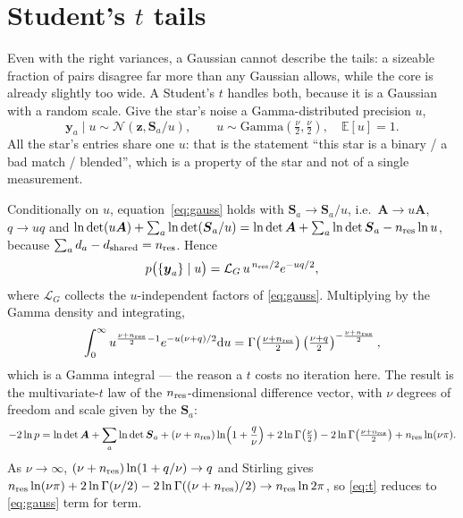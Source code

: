 \documentclass[11pt,a4paper]{article}
\newcommand{\bv}[1]{\boldsymbol{#1}}          %
\newcommand{\bM}[1]{\boldsymbol{#1}}          %
\newcommand{\dd}{\mathrm{d}}
\newcommand{\lndet}{\ln\det}
\newcommand{\N}{\mathcal{N}}
\begin{document}
\section{Student's $t$ tails}
\label{sec:t}

Even with the right variances, a Gaussian cannot describe the tails: a sizeable
fraction of pairs disagree far more than any Gaussian allows, while the core is
already slightly too wide. A Student's $t$ handles both, because it is a Gaussian
with a random scale. Give the star's noise a Gamma-distributed precision $u$,
\begin{equation}
  \bv y_a \mid u \sim \N(\bv z, \bM S_a/u), \qquad
  u \sim \mathrm{Gamma}\!\left(\tfrac\nu2,\tfrac\nu2\right), \quad \mathbb E[u]=1 .
\end{equation}
All the star's entries share one $u$: that is the statement ``this star is a
binary / a bad match / blended'', which is a property of the star and not of a
single measurement.

Conditionally on $u$, equation~\eqref{eq:gauss} holds with $\bM S_a\to\bM S_a/u$,
i.e.\ $\bM A\to u\bM A$, $q\to uq$ and $\lndet(u\bM A)+\sum_a\lndet(\bM S_a/u)
= \lndet\bM A+\sum_a\lndet\bM S_a - n_{\rm res}\ln u$, because
$\sum_a d_a - d_{\rm shared} = n_{\rm res}$. Hence
\begin{equation}
  p\big(\{\bv y_a\}\mid u\big) = \mathcal L_G\, u^{\,n_{\rm res}/2}e^{-uq/2},
\end{equation}
where $\mathcal L_G$ collects the $u$-independent factors of
\eqref{eq:gauss}. Multiplying by the Gamma density and integrating,
\begin{equation}
  \int_0^\infty u^{\frac{\nu+n_{\rm res}}{2}-1}e^{-u(\nu+q)/2}\dd u
  = \Gamma\!\left(\tfrac{\nu+n_{\rm res}}{2}\right)
    \left(\tfrac{\nu+q}{2}\right)^{-\frac{\nu+n_{\rm res}}{2}},
\end{equation}
which is a Gamma integral --- the reason a $t$ costs no iteration here. The
result is the multivariate-$t$ law of the $n_{\rm res}$-dimensional difference
vector, with $\nu$ degrees of freedom and scale given by the $\bM S_a$:
\begin{equation}
  -2\ln p = \lndet\bM A + \sum_a \lndet\bM S_a
  + (\nu+n_{\rm res})\ln\!\left(1+\frac{q}{\nu}\right)
  + 2\ln\Gamma\!\left(\tfrac\nu2\right) - 2\ln\Gamma\!\left(\tfrac{\nu+n_{\rm res}}{2}\right)
  + n_{\rm res}\ln(\nu\pi).
  \label{eq:t}
\end{equation}
As $\nu\to\infty$, $(\nu+n_{\rm res})\ln(1+q/\nu)\to q$ and Stirling gives
$n_{\rm res}\ln(\nu\pi)+2\ln\Gamma(\nu/2)-2\ln\Gamma((\nu+n_{\rm res})/2)\to n_{\rm res}\ln 2\pi$,
so \eqref{eq:t} reduces to \eqref{eq:gauss} term for term.
\end{document}
